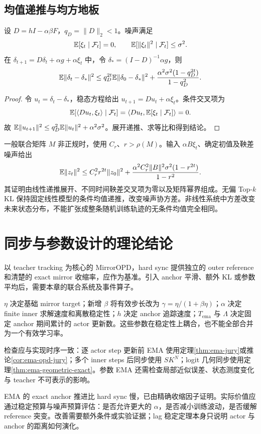 \subsection{均值递推与均方地板}

\begin{theorem}[固定线性滞后模型的均方界]
设 $D=hI-\alpha\beta F$，$q_D=\|D\|_2<1$。噪声满足
\[
 \mathbb{E}[\xi_t\mid\mathcal F_t]=0,\qquad
 \mathbb{E}[\|\xi_t\|^2\mid\mathcal F_t]\le\sigma^2.
\]
在 $\delta_{t+1}=D\delta_t+\alpha g+\alpha\xi_t$ 中，令 $\delta_*=(I-D)^{-1}\alpha g$，则
\[
 \mathbb{E}\|\delta_t-\delta_*\|^2
 \le q_D^{2t}\mathbb{E}\|\delta_0-\delta_*\|^2
 +\frac{\alpha^2\sigma^2(1-q_D^{2t})}{1-q_D^2}.
\]
\end{theorem}
\begin{proof}
令 $u_t=\delta_t-\delta_*$，稳态方程给出 $u_{t+1}=Du_t+\alpha\xi_t$。条件交叉项为
\[
 \mathbb{E}[\langle Du_t,\xi_t\rangle\mid\mathcal F_t]
 =\langle Du_t,\mathbb{E}[\xi_t\mid\mathcal F_t]\rangle=0.
\]
故 $\mathbb{E}\|u_{t+1}\|^2\le q_D^2\mathbb{E}\|u_t\|^2+\alpha^2\sigma^2$。展开递推、求等比和得到结论。
\end{proof}

一般联合矩阵 $M$ 非正规时，使用 $C_r$、$r>\rho(M)$。输入 $\alpha B\xi_t$、确定初值及鞅差噪声给出
\[
 \mathbb{E}\|z_t\|^2\le C_r^2r^{2t}\|z_0\|^2
 +\frac{\alpha^2C_r^2\|B\|^2\sigma^2(1-r^{2t})}{1-r^2}.
\]
其证明由线性递推展开、不同时间鞅差交叉项为零以及矩阵幂界组成。无偏 Top-$k$ KL 保持固定线性模型的条件均值递推，改变噪声协方差。非线性系统中方差改变未来状态分布，不能扩张成整条随机训练轨迹的无条件均值完全相同。

\section{同步与参数设计的理论结论}

以 teacher tracking 为核心的 MirrorOPD，hard sync 提供独立的 outer reference 和清楚的 exact mirror 收缩率，应作为基准。引入 anchor 平滑、额外 KL 或参数平均后，需要本章的联合系统及事件算子。

$\eta$ 决定基础 mirror target；新增 $\beta$ 将有效步长改为 $\gamma=\eta/(1+\beta\eta)$；$\alpha$ 决定 finite inner 求解速度和离散稳定性；$h$ 决定 anchor 追踪速度；$T_{\mathrm{ema}}$ 与 $\Lambda$ 决定固定 anchor 期间累计的 actor 更新数。这些参数在稳定性上耦合，也不能全部合并为一个有效学习率。

检查应与实现时序一致：逐 actor step 更新前 EMA 使用定理\ref{thm:ema-jury}或推论\ref{cor:ema-opd-jury}；多个 inner steps 后同步使用 $SK^N$；logit 几何同步使用定理\ref{thm:ema-geometric-exact}。参数 EMA 还需检查局部近似误差、状态测度变化与 teacher 不可表示的影响。

EMA 的 exact anchor 推进比 hard sync 慢，已由精确收缩因子证明。实际价值应通过稳定预算与噪声预算评估：是否允许更大的 $\alpha$，是否减小训练波动，是否缓解 reference 突变。改善需要额外条件或实验证据；lag 稳定定理本身只说明 actor 与 anchor 的距离如何演化。
